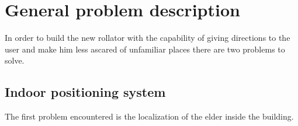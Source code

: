 \chapter{General problem description}

In order to build the new rollator with the capability of giving directions to
the user and make him less ascared of unfamiliar places there are two problems
to solve.

\section{Indoor positioning system}
The first problem encountered is the localization of the elder inside the
building.















  
